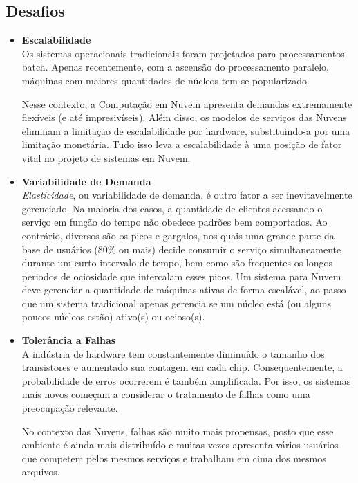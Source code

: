 \documentclass{llncs}
\begin{document}
\subsection{Desafios \cite{wentz}}
\begin{itemize}
\item \textbf{Escalabilidade} \\
Os sistemas operacionais tradicionais foram projetados para processamentos batch. Apenas recentemente, com a ascensão do processamento paralelo, máquinas com maiores quantidades de núcleos tem se popularizado.

Nesse contexto, a Computação em Nuvem apresenta demandas extremamente flexíveis (e até impresivíseis). Além disso, os modelos de serviços das Nuvens eliminam a limitação de escalabilidade por hardware, substituindo-a por uma limitação monetária. Tudo isso leva a escalabilidade à uma posição de fator vital no projeto de sistemas em Nuvem. \\

\item \textbf{Variabilidade de Demanda} \\
\emph{Elasticidade}, ou variabilidade de demanda, é outro fator a ser inevitavelmente gerenciado. Na maioria dos casos, a quantidade de clientes acessando o serviço em função do tempo não obedece padrões bem comportados. Ao contrário, diversos são os picos e gargalos, nos quais uma grande parte da base de usuários (80\% ou mais) decide consumir o serviço simultaneamente durante um curto intervalo de tempo, bem como são frequentes os longos periodos de ociosidade que intercalam esses picos. Um sistema para Nuvem deve gerenciar a quantidade de máquinas ativas de forma escalável, ao passo que um sistema tradicional apenas gerencia se um núcleo está (ou alguns poucos núcleos estão) ativo(s) ou ocioso(s). \\

\item \textbf{Tolerância a Falhas} \\
A indústria de hardware tem constantemente diminuído o tamanho dos transistores e aumentado sua contagem em cada chip. Consequentemente, a probabilidade de erros ocorrerem é também amplificada. Por isso, os sistemas mais novos começam a considerar o tratamento de falhas como uma preocupação relevante.

No contexto das Nuvens, falhas são muito mais propensas, posto que esse ambiente é ainda mais distribuído e muitas vezes apresenta vários usuários que competem pelos mesmos serviços e trabalham em cima dos mesmos arquivos. \\


\end{itemize}
\end{document}
